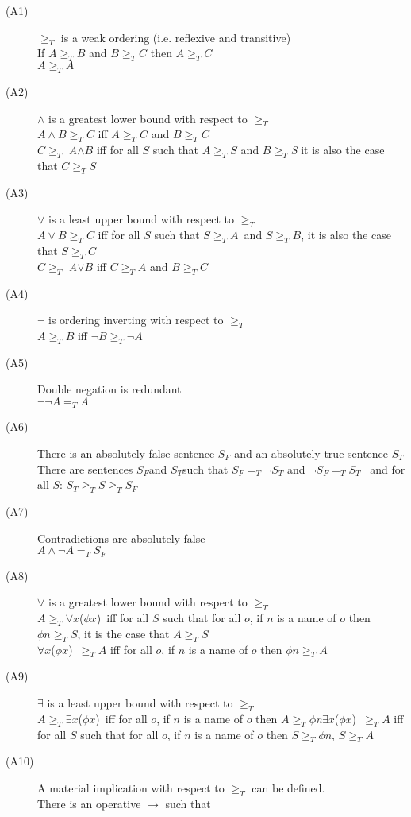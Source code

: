 \begin{description}
\item[(A1)]
\(\geqslant _T\) is a weak ordering (i.e. reflexive and transitive)\\
If \(A \geqslant _T B\) and \(B \geqslant _T C\) then
\(A \geqslant _T C\)\\
\(A \geqslant _T A\)
\item[(A2)]
\(\wedge\) is a greatest lower bound with respect to \(\geqslant _T\)\\
\(A \wedge B \geqslant _T C\) iff \(A \geqslant _T C\) and
\(B \geqslant _T C\)\\
\(C \geqslant _T\) \emph{A}\(\wedge B\) iff for all \(S\) such that
\(A \geqslant _T S\) and \(B \geqslant _T\)\emph{S} it is also the case
that \(C \geqslant _T S\)
\item[(A3)]
\(\vee\) is a least upper bound with respect to \(\geqslant _T\)\\
\(A \vee B \geqslant _T C\) iff for all \(S\) such that
\(S \geqslant _T A\)~and \(S \geqslant _T B\), it is also the case that
\(S \geqslant _T C\)\\
\(C \geqslant _T\) \emph{A}\(\vee B\) iff \(C \geqslant _T A\) and
\(B \geqslant _T C\)
\item[(A4)]
\(\neg\) is ordering inverting with respect to \(\geqslant _T\)\\
\(A \geqslant _T B\) iff \(\neg B \geqslant _T \neg A\)
\item[(A5)]
Double negation is redundant\\
\(\neg \neg A =_T A\)
\item[(A6)]
There is an absolutely false sentence \(S_F\) and an absolutely true
sentence \(S_T\)\\
There are sentences \(S_F\)and \(S_T\)such that \(S_F =_T \neg S_T\) and
\(\neg S_F =_T S_T\)~ and for all \(S\):
\(S_T \geqslant _T S \geqslant _T S_F\)
\item[(A7)]
Contradictions are absolutely false\\
\(A \wedge \neg A =_T S_F\)
\item[(A8)]
\(\forall\) is a greatest lower bound with respect to \(\geqslant _T\)\\
\(A \geqslant _T \forall x\)(\(\phi x\))~iff for all \(S\) such that for
all \(o\), if \(n\) is a name of \(o\) then \(\phi n \geqslant _T S\),
it is the case that \(A \geqslant _T S\)\\
\(\forall x\)(\(\phi x\))~\(\geqslant _T A\) iff for all \(o\), if \(n\)
is a name of \(o\) then \(\phi n \geqslant _T A\)
\item[(A9)]
\(\exists\) is a least upper bound with respect to \(\geqslant _T\)\\
\(A \geqslant _T \exists x\)(\(\phi x\))~iff for all \(o\), if \(n\) is
a name of \(o\) then
\(A \geqslant _T \phi\)\emph{n}\(\exists x\)(\(\phi x\))~\(\geqslant _T A\)
iff for all \(S\) such that for all \(o\), if \(n\) is a name of \(o\)
then \(S \geqslant _T \phi n\), \(S \geqslant _T A\)
\item[(A10)]
A material implication with respect to \(\geqslant _T\) can be
defined.\\
There is an operative \(\rightarrow\) such that


\end{description}
